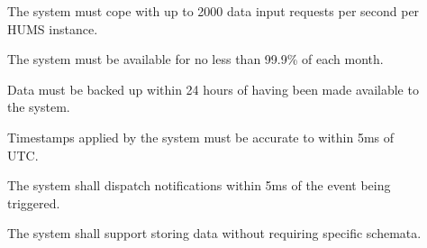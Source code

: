 \begin{description}
	\item[]  The system must cope with up to 2000 data input requests 	per second per HUMS instance. 
	\item[] The system must be available for no less than 99.9\% of 	each month.
	\item[]  Data must be backed up within 24 hours of having been 	made available to the system.
	 \item[] Timestamps applied by the system must be accurate to 	within 5ms of UTC.
	\item[]  The system shall dispatch notifications within 5ms of the 	event being triggered.
	\item[] The system shall support storing data without requiring 	specific schemata.
\end{description}

